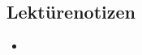 \documentclass[emulatestandardclasses]{scrartcl}
\begin{document}
\subsection{Lektürenotizen}

\begin{itemize}
  \item 
\end{itemize}

%
%
%
%


\end{document}
